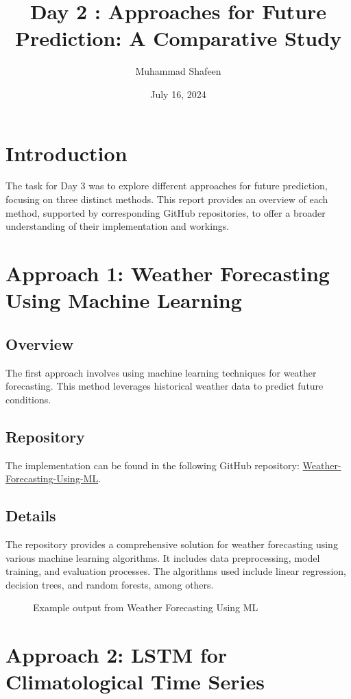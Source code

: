 \documentclass{article}
\title{Day 2 : Approaches for Future Prediction: A Comparative Study}
\author{Muhammad Shafeen}
\date{July 16, 2024}
\begin{document}
\maketitle

\section{Introduction}
The task for Day 3 was to explore different approaches for future prediction, focusing on three distinct methods. This report provides an overview of each method, supported by corresponding GitHub repositories, to offer a broader understanding of their implementation and workings.

\section{Approach 1: Weather Forecasting Using Machine Learning}
\subsection{Overview}
The first approach involves using machine learning techniques for weather forecasting. This method leverages historical weather data to predict future conditions.

\subsection{Repository}
The implementation can be found in the following GitHub repository: \href{https://github.com/Hrishikesh332/Weather-Forecasting-Using-ML}{Weather-Forecasting-Using-ML}.

\subsection{Details}
The repository provides a comprehensive solution for weather forecasting using various machine learning algorithms. It includes data preprocessing, model training, and evaluation processes. The algorithms used include linear regression, decision trees, and random forests, among others.

\begin{figure}[h]
\centering
\caption{Example output from Weather Forecasting Using ML}
\end{figure}

\section{Approach 2: LSTM for Climatological Time Series}
\end{document}
